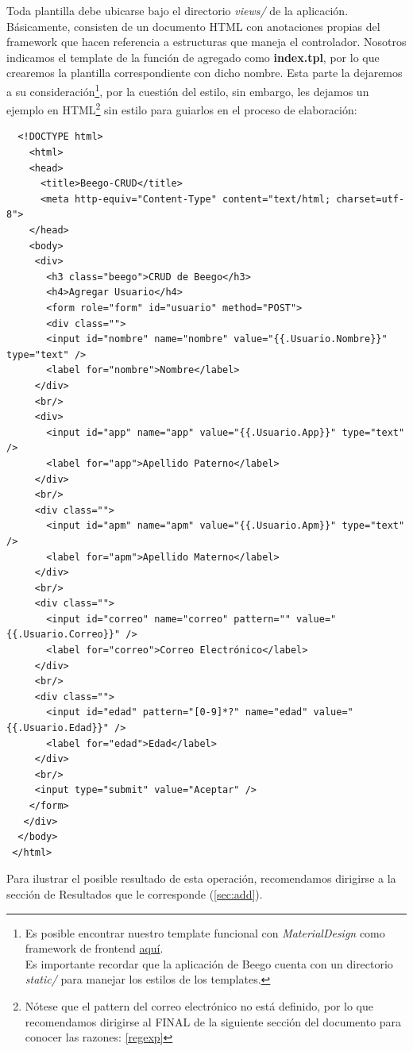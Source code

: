\documentclass[12pt]{article}
\begin{document}
Toda plantilla debe ubicarse bajo el directorio \textit{views/} de la aplicación.
Básicamente, consisten de un documento HTML con anotaciones propias del framework
que hacen referencia a estructuras que maneja el controlador.
Nosotros indicamos el template de la función de agregado como \textbf{index.tpl},
por lo que crearemos la plantilla correspondiente con dicho nombre.
Esta parte la dejaremos a su consideración\footnote{Es posible encontrar nuestro
  template funcional con \textit{MaterialDesign} como framework de frontend
  \href{https://github.com/Kihui/Beego-CRUD/blob/master/views/index.tpl}{aquí}.\\
  Es importante recordar que la aplicación de Beego cuenta con un directorio \textit{static/}
para manejar los estilos de los templates.},
por la cuestión del estilo,
sin embargo, les dejamos un ejemplo en HTML\footnote{Nótese que el pattern del correo
  electrónico no está definido, por lo que recomendamos dirigirse al FINAL de la siguiente
  sección del documento para conocer las razones: \ref{regexp}}
sin estilo para guiarlos en el proceso de elaboración:
\begin{verbatim}
  <!DOCTYPE html>
    <html>
    <head>
      <title>Beego-CRUD</title>
      <meta http-equiv="Content-Type" content="text/html; charset=utf-8">
    </head>
    <body>
     <div>
       <h3 class="beego">CRUD de Beego</h3>
       <h4>Agregar Usuario</h4>
       <form role="form" id="usuario" method="POST">
       <div class="">
       <input id="nombre" name="nombre" value="{{.Usuario.Nombre}}" type="text" />
       <label for="nombre">Nombre</label>
     </div>
     <br/>
     <div>
       <input id="app" name="app" value="{{.Usuario.App}}" type="text" />
       <label for="app">Apellido Paterno</label>
     </div>
     <br/>
     <div class="">
       <input id="apm" name="apm" value="{{.Usuario.Apm}}" type="text" />
       <label for="apm">Apellido Materno</label>
     </div>
     <br/>
     <div class="">
       <input id="correo" name="correo" pattern="" value="{{.Usuario.Correo}}" />
       <label for="correo">Correo Electrónico</label>
     </div>
     <br/>
     <div class="">
       <input id="edad" pattern="[0-9]*?" name="edad" value="{{.Usuario.Edad}}" />
       <label for="edad">Edad</label>
     </div>
     <br/>
     <input type="submit" value="Aceptar" />
    </form>
   </div>
  </body>
 </html>    
\end{verbatim}
Para ilustrar el posible resultado de esta operación, recomendamos dirigirse a la sección de Resultados que le corresponde
(\ref{sec:add}).
\end{document}
